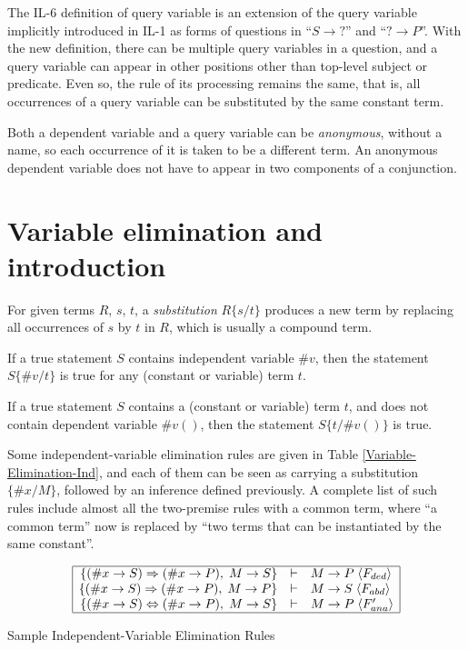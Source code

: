 The IL-6 definition of query variable is an extension of the query variable implicitly introduced in IL-1 as forms of questions in ``\(S \rightarrow ?\)'' and ``\(? \rightarrow P\)''. With the new definition, there can be multiple query variables in a question, and a query variable can appear in other positions other than top-level subject or predicate. Even so, the rule of its processing remains the same, that is, all occurrences of a query variable can be substituted by the same constant term.

Both a dependent variable and a query variable can be \emph{anonymous}, without a name, so each occurrence of it is taken to be a different term. An anonymous dependent variable does not have to appear in two components of a conjunction.


\section{Variable elimination and introduction}

\begin{defi}
For given terms $R$, $s$, $t$, a \emph{substitution} $R\{s/t\}$ produces a new term by replacing all occurrences of $s$ by $t$ in $R$, which is usually a compound term.
\end{defi}

\begin{theo}
If a true statement $S$ contains independent variable $\#v$, then the statement $S\{\#v/t\}$ is true for any (constant or variable) term $t$.
\end{theo}

\begin{theo}
If a true statement $S$ contains a (constant or variable) term $t$, and does not contain dependent variable $\#v()$, then the statement $S\{t/\#v()\}$ is true.
\end{theo}

Some independent-variable elimination rules are given in Table \ref{Variable-Elimination-Ind}, and each of them can be seen as carrying a substitution $\{\#x/M\}$, followed by an inference defined previously. A complete list of such rules include almost all the two-premise rules with a common term, where ``a common term'' now is replaced by ``two terms that can be instantiated by the same constant''.

\begin{table}[htb]
\[\begin{array}{|rcl|}
\hline
\{(\#x \rightarrow S) \Rightarrow (\#x \rightarrow P) , \; M \rightarrow S \} & \vdash & M \rightarrow P \; \langle F_{ded}\rangle  \\
\{(\#x \rightarrow S) \Rightarrow (\#x \rightarrow P) , \; M \rightarrow P \} & \vdash & M \rightarrow S \; \langle F_{abd}\rangle  \\
\{(\#x \rightarrow S) \Leftrightarrow (\#x \rightarrow P) , \; M \rightarrow S \} & \vdash & M \rightarrow P \; \langle F'_{ana}\rangle  \\
\hline
\end{array}\]
\caption{Sample Independent-Variable Elimination Rules}
\label{Variable-Elimination-Ind}
\end{table}

